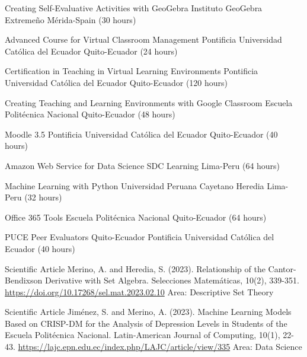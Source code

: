 \documentclass[
    a4paper,
    maincolor=cvblue!70!blue,
    sidecolor=gray!30,
    sectioncolor=cvblue!70!blue,
    sidebarwidth=7.5cm,
    topbottommargin=20pt,
    leftrightmargin=20pt,
]{fortysecondscv}
\begin{document}
    {Creating Self-Evaluative Activities with GeoGebra}
    {Instituto GeoGebra Extremeño}
    {Mérida-Spain (30 hours)}

    {Advanced Course for Virtual Classroom Management}
    {Pontificia Universidad Católica del Ecuador}
    {Quito-Ecuador (24 hours)}

    {Certification in Teaching in Virtual Learning Environments}
    {Pontificia Universidad Católica del Ecuador}
    {Quito-Ecuador (120 hours)}

    {Creating Teaching and Learning Environments with Google Classroom}
    {Escuela Politécnica Nacional}
    {Quito-Ecuador (48 hours)}

    {Moodle 3.5}
    {Pontificia Universidad Católica del Ecuador}
    {Quito-Ecuador (40 hours)}


    {Amazon Web Service for Data Science}
    {SDC Learning}
    {Lima-Peru (64 hours)}

    {Machine Learning with Python}
    {Universidad Peruana Cayetano Heredia}
    {Lima-Peru (32 hours)}

    {Office 365 Tools}
    {Escuela Politécnica Nacional}
    {Quito-Ecuador (64 hours)}

    {PUCE Peer Evaluators}
    {Quito-Ecuador}
    {Pontificia Universidad Católica del Ecuador (40 hours)}


    {Scientific Article}
    {Merino, A. and Heredia, S. (2023). Relationship of the Cantor-Bendixson Derivative with Set Algebra. Selecciones Matemáticas, 10(2), 339-351.}
    {\url{https://doi.org/10.17268/sel.mat.2023.02.10}}
    {Area: Descriptive Set Theory}
    
    {Scientific Article}
    {Jiménez, S. and Merino, A. (2023). Machine Learning Models Based on CRISP-DM for the Analysis of Depression Levels in Students of the Escuela Politécnica Nacional. Latin-American Journal of Computing, 10(1), 22-43.}     
    {\url{https://lajc.epn.edu.ec/index.php/LAJC/article/view/335}}
    {Area: Data Science}
    
\end{document}
